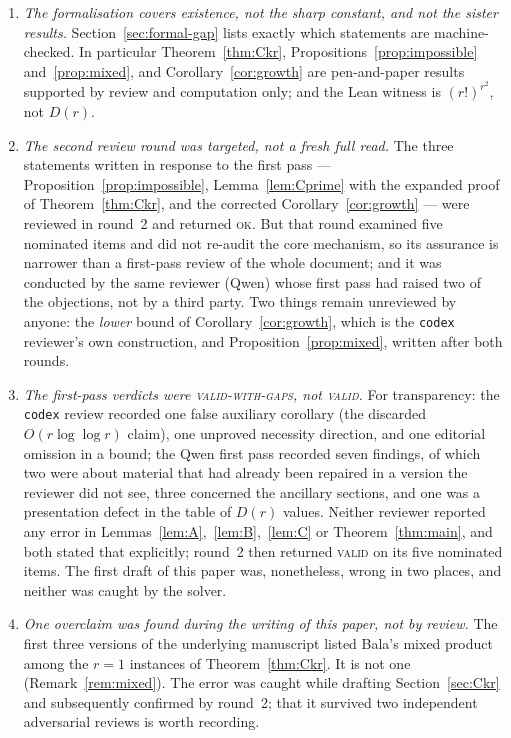 \documentclass[11pt]{article}
\theoremstyle{plain}
\theoremstyle{definition}
\theoremstyle{remark}
\numberwithin{equation}{section}
\begin{document}
\begin{enumerate}
\item \emph{The formalisation covers existence, not the sharp constant, and not the sister
results.} Section~\ref{sec:formal-gap} lists exactly which statements are machine-checked. In
particular Theorem~\ref{thm:Ckr}, Propositions~\ref{prop:impossible} and~\ref{prop:mixed}, and
Corollary~\ref{cor:growth} are pen-and-paper results supported by review and computation only;
and the Lean witness is $(r!)^{r^2}$, not $D(r)$.

\item \emph{The second review round was targeted, not a fresh full read.} The three statements
written in response to the first pass --- Proposition~\ref{prop:impossible},
Lemma~\ref{lem:Cprime} with the expanded proof of Theorem~\ref{thm:Ckr}, and the corrected
Corollary~\ref{cor:growth} --- were reviewed in round~2 and returned \textsc{ok}. But that round
examined five nominated items and did not re-audit the core mechanism, so its assurance is
narrower than a first-pass review of the whole document; and it was conducted by the same
reviewer (Qwen) whose first pass had raised two of the objections, not by a third party. Two
things remain unreviewed by anyone: the \emph{lower} bound of Corollary~\ref{cor:growth}, which
is the \texttt{codex} reviewer's own construction, and Proposition~\ref{prop:mixed}, written
after both rounds.

\item \emph{The first-pass verdicts were \textsc{valid-with-gaps}, not \textsc{valid}.} For
transparency: the \texttt{codex} review recorded one false auxiliary corollary (the discarded
$O(r\log\log r)$ claim), one unproved necessity direction, and one editorial omission in a bound;
the Qwen first pass recorded seven findings, of which two were about material that had already
been repaired in a version the reviewer did not see, three concerned the ancillary sections, and
one was a presentation defect in the table of $D(r)$ values. Neither reviewer reported any error
in Lemmas~\ref{lem:A},~\ref{lem:B},~\ref{lem:C} or Theorem~\ref{thm:main}, and both stated that
explicitly; round~2 then returned \textsc{valid} on its five nominated items. The first draft of
this paper was, nonetheless, wrong in two places, and neither was caught by the solver.

\item \emph{One overclaim was found during the writing of this paper, not by review.} The
first three versions of the underlying manuscript listed Bala's mixed product among the $r=1$
instances of Theorem~\ref{thm:Ckr}. It is not one (Remark~\ref{rem:mixed}). The error was caught
while drafting Section~\ref{sec:Ckr} and subsequently confirmed by round~2; that it survived two
independent adversarial reviews is worth recording.


\end{enumerate}
\end{document}

